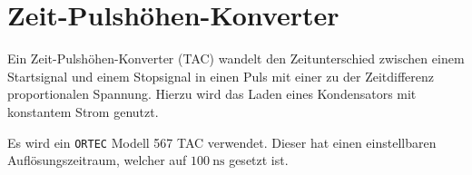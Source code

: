 \section{Zeit-Pulshöhen-Konverter}

Ein Zeit-Pulshöhen-Konverter (TAC) wandelt den Zeitunterschied zwischen einem Startsignal und einem Stopsignal in einen Puls mit einer zu der Zeitdifferenz proportionalen Spannung. Hierzu wird das Laden eines Kondensators mit konstantem Strom genutzt\cite[294]{leotechniques}.

Es wird ein \texttt{ORTEC} Modell 567 TAC verwendet. Dieser hat einen einstellbaren Auflösungszeitraum, welcher auf $\SI{100}{\nano\second}$ gesetzt ist\cite{tac}.
